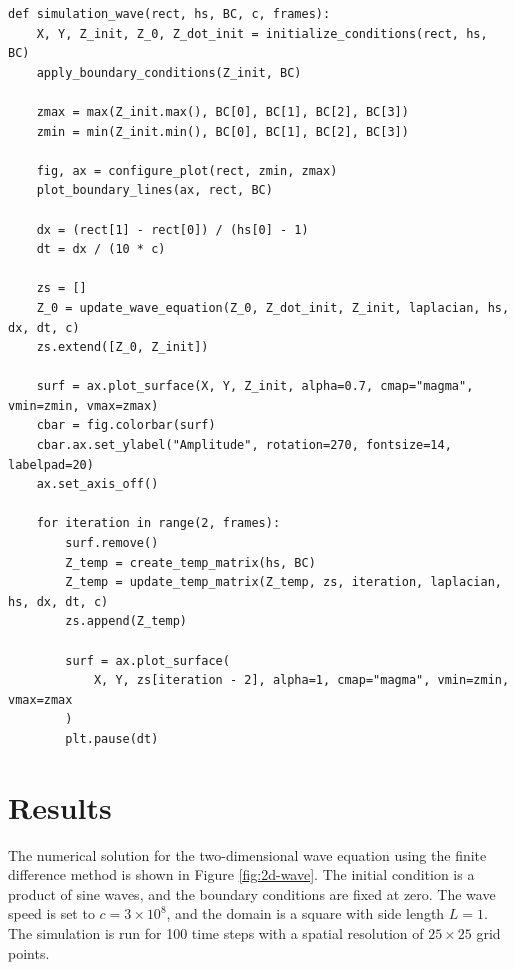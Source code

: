 \documentclass{article}
\begin{document}
\begin{lstlisting}[style=Python, caption={Simulation Function}]
def simulation_wave(rect, hs, BC, c, frames):
    X, Y, Z_init, Z_0, Z_dot_init = initialize_conditions(rect, hs, BC)
    apply_boundary_conditions(Z_init, BC)

    zmax = max(Z_init.max(), BC[0], BC[1], BC[2], BC[3])
    zmin = min(Z_init.min(), BC[0], BC[1], BC[2], BC[3])

    fig, ax = configure_plot(rect, zmin, zmax)
    plot_boundary_lines(ax, rect, BC)

    dx = (rect[1] - rect[0]) / (hs[0] - 1)
    dt = dx / (10 * c)

    zs = []
    Z_0 = update_wave_equation(Z_0, Z_dot_init, Z_init, laplacian, hs, dx, dt, c)
    zs.extend([Z_0, Z_init])

    surf = ax.plot_surface(X, Y, Z_init, alpha=0.7, cmap="magma", vmin=zmin, vmax=zmax)
    cbar = fig.colorbar(surf)
    cbar.ax.set_ylabel("Amplitude", rotation=270, fontsize=14, labelpad=20)
    ax.set_axis_off()

    for iteration in range(2, frames):
        surf.remove()
        Z_temp = create_temp_matrix(hs, BC)
        Z_temp = update_temp_matrix(Z_temp, zs, iteration, laplacian, hs, dx, dt, c)
        zs.append(Z_temp)

        surf = ax.plot_surface(
            X, Y, zs[iteration - 2], alpha=1, cmap="magma", vmin=zmin, vmax=zmax
        )
        plt.pause(dt)
\end{lstlisting}

\section{Results}

The numerical solution for the two-dimensional wave equation using the finite
difference method is shown in Figure \ref{fig:2d-wave}. The initial condition
is a product of sine waves, and the boundary conditions are fixed at zero. The
wave speed is set to \(c = 3\times 10^{8} \), and the domain is a square with
side length \(L = 1\). The simulation is run for 100 time steps with a spatial
resolution of \(25 \times 25\) grid points.
\end{document}

